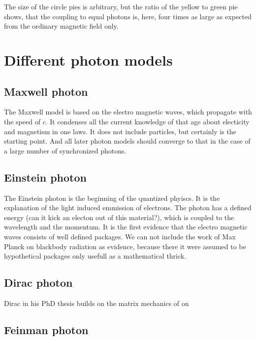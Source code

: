 The size of the circle pies is arbitrary, but the ratio of the yellow to green pie shows,
that the coupling to equal photons is, here, four times as large as expected from the ordinary magnetic field only.




\section{Different photon models}

\subsection{Maxwell photon}
The Maxwell model is based on the electro magnetic waves, which propagate with the speed of $c$. It condenses all the current knowledge of that age about electicity and magnetism in one laws. It does not include particles, but certainly is the starting point. And all later photon models should converge to that in the case of a large number of synchronized photons.


\subsection{Einstein photon}
The Einstein photon is the beginning of the quantized phyiscs. It is the explanation of the light induced emmission of electrons. The photon has a defined energy (can it kick an electon out of this material?), which is coupled to the wavelength and the momentum. It is the first evidence that the electro magnetic waves consists of well defined packages. We can not include the work of Max Planck on blackbody radiation as evidence, because there it were assumed to be hypothetical packages only usefull as a mathematical thrick.


\subsection{Dirac photon}
Dirac in his PhD thesis builds on the matrix mechanics of on 


\subsection{Feinman photon}



